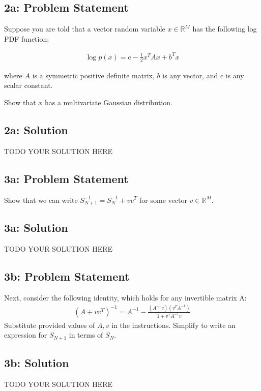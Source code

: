 \documentclass[10pt]{article}
\newcommand{\officialdirections}[1]{{\color{purple} #1}}
\begin{document}
\officialdirections{
\subsection*{2a: Problem Statement}
Suppose you are told that a vector random variable $x \in \mathbb{R}^M$ has the following log PDF function:

\begin{align}
\log p(x) = \text{c} - \frac{1}{2} x^T A x + b^T x
\end{align}

where $A$ is a symmetric positive definite matrix, $b$ is any vector, and $\text{c}$ is any scalar constant.

Show that $x$ has a multivariate Gaussian distribution.
}

\subsection{2a: Solution}
TODO YOUR SOLUTION HERE


\officialdirections{
\subsection*{3a: Problem Statement}
Show that we can write $S_{N+1}^{-1} = S_N^{-1} + vv^T$ for some vector $v \in \mathbb{R}^M$.
}


\subsection{3a: Solution}
TODO YOUR SOLUTION HERE

\officialdirections{
\subsection*{3b: Problem Statement}
Next, consider the following identity, which holds for any invertible matrix A:
\begin{align}
(A + vv^T)^{-1} = A^{-1} - \frac{ (A^{-1}v)(v^T A^{-1})}{ 1 + v^T A^{-1} v}
\end{align}
Substitute provided values of $A,v$ in the instructions. Simplify to write an expression for $S_{N+1}$ in terms of $S_{N}$.
}

\subsection{3b: Solution}
TODO YOUR SOLUTION HERE
\end{document}
